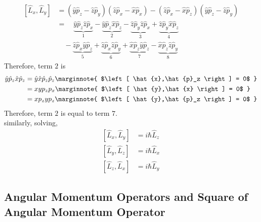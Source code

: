 \documentclass[titlepage, fleqn, a4paper, 12pt, twoside]{article}
\theoremstyle{definition}
\theoremstyle{theorem}
\let\Oldsubsection\subsection
\renewcommand{\subsection}{\FloatBarrier\Oldsubsection}
\begin{document}
\begin{align*}
	\left[ \hat{L}_x,\hat{L}_y \right] &= \left( \hat{y} \hat{p}_z - \hat{z} \hat{p}_y \right) \left( \hat{z} \hat{p}_x - \hat{x} \hat{p}_x \right) - \left( \hat{z} \hat{p}_x - \hat{x} \hat{p}_z \right) \left( \hat{y} \hat{p}_z - \hat{z} \hat{p}_y \right)\\
	&= \quad \underbrace{\hat{y} \hat{p}_z \hat{z} \hat{p}_x}_{1} - \underbrace{\hat{y} \hat{p}_z \hat{x} \hat{p}_z}_{2} - \underbrace{\hat{z} \hat{p}_y \hat{z} \hat{p}_x}_{3} + \underbrace{\hat{z} \hat{p}_y \hat{x} \hat{p}_z}_{4}\\
	&\quad - \underbrace{\hat{z} \hat{p}_x \hat{y} \hat{p}_z}_{5} + \underbrace{\hat{z} \hat{p}_x \hat{z} \hat{p}_y}_{6} + \underbrace{\hat{x} \hat{p}_z \hat{y} \hat{p}_z}_{7} - \underbrace{\hat{x} \hat{p}_z \hat{z} \hat{p}_y}_{8}
\end{align*}
Therefore, term $2$ is
\begin{align*}
	\hat{y} \hat{p}_z \hat{x} \hat{p}_z &= \hat{y} \hat{x} \hat{p}_z \hat{p}_z
	\marginnote
	{
		$\left[ \hat{x},\hat{p}_z \right] = 0$
	}\\
	&= x y p_z p_x
	\marginnote
	{
		$\left[ \hat{y},\hat{x} \right] = 0$
	}\\
	&= x p_z y p_z
	\marginnote
	{
		$\left[ \hat{y},\hat{p}_z \right] = 0$
	}
\end{align*}
Therefore, term $2$ is equal to term $7$.\\
similarly, solving,
\begin{align*}
	\left[ \hat{L}_x,\hat{L}_y \right] &= i \hbar \hat{L}_z\\
	\left[ \hat{L}_y,\hat{L}_z \right] &= i \hbar \hat{L}_x\\
	\left[ \hat{L}_z,\hat{L}_x \right] &= i \hbar \hat{L}_y
\end{align*}

\subsection{Angular Momentum Operators and Square of Angular Momentum Operator}
\end{document}
